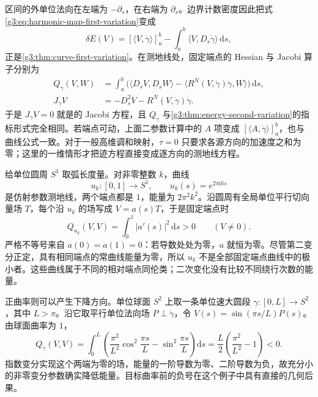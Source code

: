 区间的外单位法向在左端为 \(-\partial_s\)，在右端为 \(\partial_s\)。边界计数密度因此把式\eqref{g3:eq:harmonic-map-first-variation}变成
\[
	\delta E(V)=[\langle V,\dot\gamma\rangle]_a^b
	-\int_a^b\langle V,D_s\dot\gamma\rangle\,\mathrm ds,
\]
正是\cref{g3:thm:curve-first-variation}。在测地线处，固定端点的 Hessian 与 Jacobi 算子分别为
\begin{equation}\label{g3:eq:map-geodesic-reduction}
	\begin{aligned}
		Q_\gamma(V,W)&=\int_a^b\bigl(\langle D_sV,D_sW\rangle
		-\langle R^N(V,\dot\gamma)\dot\gamma,W\rangle\bigr)\,\mathrm ds,\\
		J_\gamma V&=-D_s^2V-R^N(V,\dot\gamma)\dot\gamma.
	\end{aligned}
\end{equation}
于是 \(J_\gamma V=0\) 就是的 Jacobi 方程，且 \(Q_\gamma\) 与\cref{g3:thm:energy-second-variation}的指标形式完全相同。若端点可动，上面二参数计算中的 \(A\) 项变成 \([\langle A,\dot\gamma\rangle]_a^b\)，也与曲线公式一致。对于一般高维调和映射，\(\tau=0\) 只要求各源方向的加速度之和为零；这里的一维情形才把迹方程直接变成逐方向的测地线方程。

\begin{example}\label{g3:exm:harmonic-map-stability-global-minimum}
	给单位圆周 \(S^1\) 取弧长度量。对非零整数 \(k\)，曲线
	\[
		u_k:[0,1]\longrightarrow S^1,\qquad u_k(s)=e^{2\pi\mathrm i ks}
	\]
	是仿射参数测地线，两个端点都是 \(1\)，能量为 \(2\pi^2k^2\)。沿圆周有全局单位平行切向量场 \(T\)，每个沿 \(u_k\) 的场写成 \(V=a(s)T\)，于是固定端点时
	\[
		Q_{u_k}(V,V)=\int_0^1|a'(s)|^2\,\mathrm ds>0\qquad(V\ne0).
	\]
	严格不等号来自 \(a(0)=a(1)=0\)：若导数处处为零，\(a\) 就恒为零。尽管第二变分正定，具有相同端点的常曲线能量为零，所以 \(u_k\) 不是全部固定端点曲线中的极小者。这些曲线属于不同的相对端点同伦类；二次变化没有比较不同绕行次数的能量。
\end{example}

正曲率则可以产生下降方向。单位球面 \(S^2\) 上取一条单位速大圆段 \(\gamma:[0,L]\to S^2\)，其中 \(L>\pi\)。沿它取平行单位法向场 \(P\perp\dot\gamma\)，令 \(V(s)=\sin(\pi s/L)P(s)\)。由球面曲率为 \(1\)，
\[
	Q_\gamma(V,V)
	=\int_0^L\left(\frac{\pi^2}{L^2}\cos^2\frac{\pi s}{L}
	-\sin^2\frac{\pi s}{L}\right)\mathrm ds
	=\frac L2\left(\frac{\pi^2}{L^2}-1\right)<0.
\]
指数变分实现这个两端为零的场，能量的一阶导数为零、二阶导数为负，故充分小的非零变分参数确实降低能量。目标曲率前的负号在这个例子中具有直接的几何后果。
